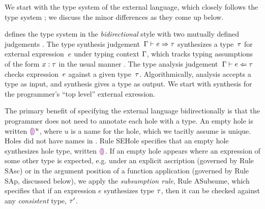 

%
%
%

%




We start with the type system of the \HazelnutLive
external language, which closely follows the \Hazelnut type
system \cite{popl-paper}; we discuss the minor differences as they come up below.

 defines the type system in the \emph{bidirectional} style 
%
with two mutually defined judgements \cite{Pierce:2000ve,bidi-tutorial,DBLP:conf/icfp/DunfieldK13,Chlipala:2005da}. The type synthesis
judgement~$\Gamma \vdash e \Rightarrow \tau$ synthesizes a type~$\tau$
for external expression~$e$ under typing context $\Gamma$, which tracks typing
assumptions of the form $x : \tau$ in the usual
manner \cite{pfpl,tapl}.
%
The type analysis judgement~$\Gamma \vdash e \Leftarrow \tau$ checks
expression~$e$ against a given type~$\tau$.
%
Algorithmically, analysis accepts a type as input, and synthesis gives
a type as output.
%
We start with synthesis for the programmer's ``top level'' external
exression.


The primary benefit of specifying the \HazelnutLive external language 
bidirectionally is that the programmer does not need to annotate each hole with a type. 
%
An empty hole is
written $\textcolor{violet}{\llparenthesis}\textcolor{violet}{\rrparenthesis}^{u}$, where $u$ is a name for the hole, which we tacitly assume is unique. 
Holes did not have names in \Hazelnut. 
%
Rule {SEHole} specifies that an empty hole synthesizes hole type, written $\textcolor{violet}{\llparenthesis}\textcolor{violet}{\rrparenthesis}$.
%
If an empty hole appears where an expression of some other type is
expected, e.g. under an explicit ascription (governed by Rule {SAsc})
or in the argument position of a function application (governed by
Rule {SAp}, discussed below), we apply the \emph{subsumption rule},
Rule {ASubsume}, which specifies that if an expression $e$ synthesizes
type $\tau$, then it can be checked against any \emph{consistent}
type, $\tau'$.

